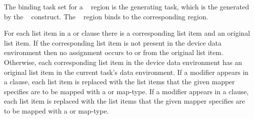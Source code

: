 \binding
The binding task set for a ~ region is the
generating task, which is the  generated
by the ~ construct. The ~
region binds to the corresponding  region.

\descr
For each list item in a  or  clause there is a corresponding list item and an
original list item. If the corresponding list item is not present in the device data environment then no assignment occurs to or from the original list item. Otherwise, each corresponding list item in the
device data environment has an original list item in the current task's data
environment.  If a  modifier appears in a  clause, each list item is
replaced with the list items that the given mapper specifies are to be mapped
with a  or  map-type. If a  modifier
appears in a  clause, each list item is replaced with the list items
that the given mapper specifies are to be mapped with a  or
 map-type.

